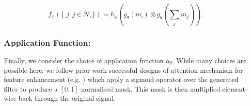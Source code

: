 \begin{equation} \label{star} 
 f_\phi (\{\bm_j: j \in \mathcal{N}_i\}) = h_\phi (g_\theta (m_i) \otimes g_\theta (\sum_{j} m_j)),
\end{equation}



\subsubsection{Application Function:} Finally, we consider the choice of application function $a_\theta$.  While many choices are possible here, we follow prior work  successful designs of attention mechanism for feature enhancement (e.g. \cite{dauphin2017language,hu2019squeeze}) which apply a sigmoid operator over the generated filter to produce a $[0, 1]$-normalised mask. This mask is then multiplied element-wise back through the original signal.




